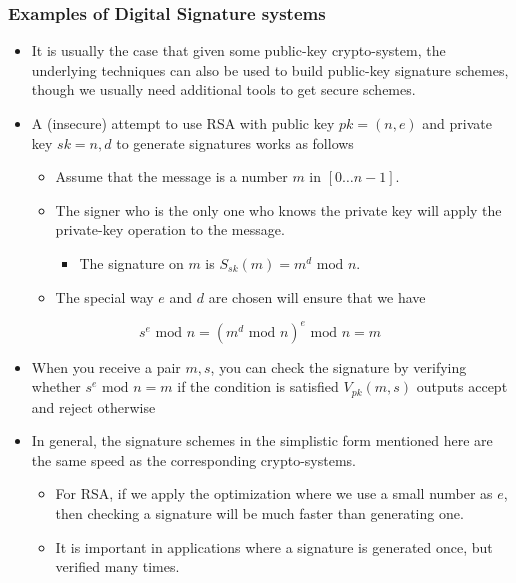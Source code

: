 \documentclass[11pt]{article}
\begin{document}
\subsubsection{Examples of Digital Signature systems}
\label{sec:org86f1529}
\begin{itemize}
\item It is usually the case that given some public-key crypto-system, the underlying techniques can also be used to build public-key signature schemes, though we usually need additional tools to get secure schemes.

\item A (insecure) attempt to use RSA with public key \(pk=(n,e)\) and private key \(sk = n,d\) to generate signatures works as follows
\begin{itemize}
\item Assume that the message is a number \(m\) in \([0\dots n-1]\).
\item The signer who is the only one who knows the private key will apply the private-key operation to the message.
\begin{itemize}
\item The signature on \(m\) is \(S_{sk}(m) = m^d \text{ mod } n\).
\end{itemize}
\item The special way \(e\) and \(d\) are chosen will ensure that we have
\end{itemize}
\end{itemize}
\begin{equation}
  s^e \text{ mod } n = (m^d \text{ mod } n)^e \text{ mod } n = m 
\end{equation}
\begin{itemize}
\item When you receive a pair \(m,s\), you can check the signature by verifying whether \(s^e \text{ mod } n = m\) if the condition is satisfied \(V_{pk}(m,s)\) outputs accept and reject otherwise

\item In general, the signature schemes in the simplistic form mentioned here are the same speed as the corresponding crypto-systems. 
\begin{itemize}
\item For RSA, if we apply the optimization where we use a small number as \(e\), then checking a signature will be much faster than generating one.
\item It is important in applications where a signature is generated once, but verified many times.
\end{itemize}
\end{itemize}
\end{document}
